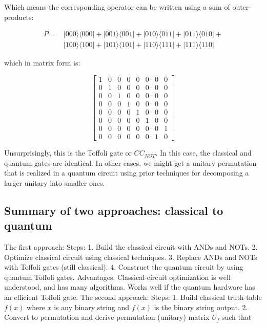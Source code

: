 \documentclass[main.tex]{subfiles}
\begin{document}
    Which means the corresponding operator can be written using a sum of outer-products:
    
    $$
    \begin{aligned}
    P=&|000\rangle\langle 000|+| 001\rangle\langle 001|+| 010\rangle\langle 011|+| 011\rangle\langle 010|+\\
    &|100\rangle\langle 100|+| 101\rangle\langle 101|+| 110\rangle\langle 111|+| 111\rangle\langle 110|
    \end{aligned}
    $$
    
    which in matrix form is:
    
    $$
    \left[\begin{array}{llllllll}
    1 & 0 & 0 & 0 & 0 & 0 & 0 & 0 \\
    0 & 1 & 0 & 0 & 0 & 0 & 0 & 0 \\
    0 & 0 & 1 & 0 & 0 & 0 & 0 & 0 \\
    0 & 0 & 0 & 1 & 0 & 0 & 0 & 0 \\
    0 & 0 & 0 & 0 & 1 & 0 & 0 & 0 \\
    0 & 0 & 0 & 0 & 0 & 1 & 0 & 0 \\
    0 & 0 & 0 & 0 & 0 & 0 & 0 & 1 \\
    0 & 0 & 0 & 0 & 0 & 0 & 1 & 0
    \end{array}\right]
    $$
    
    Unsurprisingly, this is the Toffoli gate or $C C_{NOT}$. In this case, the classical and quantum gates are identical. In other cases, we might get a unitary permutation that is realized in a quantum circuit using prior techniques for decomposing a larger unitary into smaller ones.
    

\subsection{Summary of two approaches: classical to quantum}

    The first approach: Steps: 1. Build the classical circuit with ANDs and NOTs. 2. Optimize classical circuit using classical techniques. 3. Replace ANDs and NOTs with Toffoli gates (still classical). 4. Construct the quantum circuit by using quantum Toffoli gates. Advantages: Classical-circuit optimization is well understood, and has many algorithms. Works well if the quantum hardware has an efficient Toffoli gate. The second approach: Steps: 1. Build classical truth-table $f(x)$ where $x$ is any binary string and $f(x)$ is the binary string output. 2. Convert to permutation and derive permutation (unitary) matrix $U_{f}$ such that
    
\end{document}
